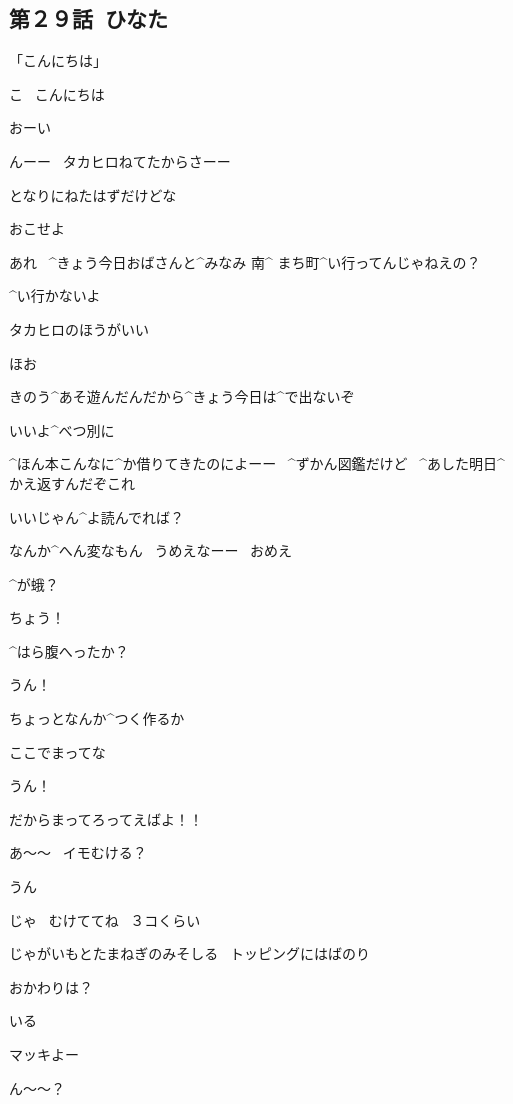 \subsection{第２９話\ ひなた}

\page[80]
\Kokone 「こんにちは」

\Takahiro こ
\ こんにちは

\Alpha おーい

\page[82]
\Makki んーー
\ タカヒロねてたからさーー

\Makki となりにねたはずだけどな

\Takahiro おこせよ

\page[83]
\Takahiro あれ
\ ^{きょう}{今日}おばさんと^{みなみ }{南}^{ まち}{町}^{い}{行}ってんじゃねえの？

\Makki ^{い}{行}かないよ

\Makki タカヒロのほうがいい

\Takahiro ほお

\Takahiro きのう^{あそ}{遊}んだんだから^{きょう}{今日}は^{で}{出}ないぞ

\Makki いいよ^{べつ}{別}に

\Makki ^{ほん}{本}こんなに^{か}{借}りてきたのによーー
\ ^{ずかん}{図鑑}だけど
\ ^{あした}{明日}^{かえ}{返}すんだぞこれ

\Takahiro いいじゃん^{よ}{読}んでれば？

\page[84]
\Takahiro なんか^{へん}{変}なもん
\ うめえなーー
\ おめえ

\Takahiro ^{が}{蛾}？

\Makki ちょう！

\page[85]
\Takahiro ^{はら}{腹}へったか？

\Makki うん！

\Takahiro ちょっとなんか^{つく}{作}るか

\Takahiro ここでまってな

\Makki うん！

\page[86]
\Takahiro だからまってろってえばよ！！

\Takahiro あ〜〜
\ イモむける？

\Makki うん

\Takahiro じゃ
\ むけててね
\ ３コくらい

\page[87]
\Narrator じゃがいもとたまねぎのみそしる
\ トッピングにはばのり

\Takahiro おかわりは？

\Makki いる

\page[88]
\Takahiro マッキよー

\Makki ん〜〜？

